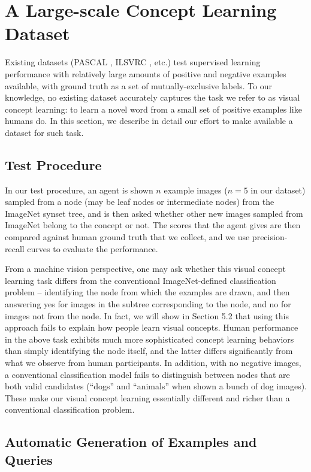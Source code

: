 \section{A Large-scale Concept Learning Dataset}\label{sec:mechturk}

Existing datasets (PASCAL \cite{pascal}, ILSVRC \cite{ilsvrc}, etc.) test supervised learning performance with relatively large amounts of positive and negative examples available, with ground truth as a set of mutually-exclusive labels. To our knowledge, no existing dataset accurately captures the task we refer to as visual concept learning: to learn a novel word from a small set of positive examples like humans do. In this section, we describe in detail our effort to make available a dataset for such task.

\subsection{Test Procedure}

In our test procedure, an agent is shown $n$ example images ($n=5$ in our dataset) sampled from a node (may be leaf nodes or intermediate nodes) from the ImageNet synset tree, and is then asked whether other new images sampled from ImageNet belong to the concept or not. The scores that the agent gives are then compared against human ground truth that we collect, and we use precision-recall curves to evaluate the performance.

From a machine vision perspective, one may ask whether this visual concept learning task differs from the conventional ImageNet-defined classification problem -- identifying the node from which the examples are drawn, and then answering yes for images in the subtree corresponding to the node, and no for images not from the node. In fact, we will show in Section 5.2 that using this approach fails to explain how people learn visual concepts. Human performance in the above task exhibits much more sophisticated concept learning behaviors than simply identifying the node itself, and the latter differs significantly from what we observe from human participants. In addition, with no negative images, a conventional classification model fails to distinguish between nodes that are both valid candidates (\eg ``dogs'' and ``animals'' when shown a bunch of dog images). These make our visual concept learning essentially different and richer than a conventional classification problem.

\subsection{Automatic Generation of Examples and Queries}

